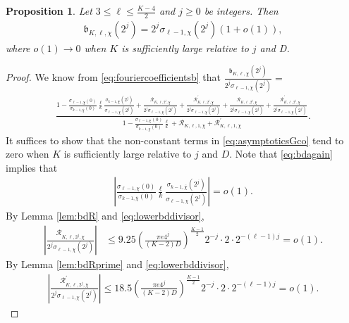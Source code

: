 \documentclass[11pt,letterpaper,reqno]{amsart}
\numberwithin{figure}{section}
\numberwithin{table}{section}
\theoremstyle{definition}
\theoremstyle{plain}
\newtheorem{proposition}[theorem]{Proposition}
\theoremstyle{definition}
\theoremstyle{definition}
\theoremstyle{remark}
\numberwithin{equation}{section}
\theoremstyle{remark}
\begin{document}
\begin{proposition}\label{prop:asymptoticB}
   Let $3\leq\ell\leq\frac{K-4}{2}$ and $j\geq0$ be integers. Then
    \begin{align*}
        \mathfrak{b}_{K,\ell,\chi}(2^j)=2^{j}\sigma_{\ell-1,\chi}(2^{j})(1+o(1)),
    \end{align*}
    where $o(1)\rightarrow 0$ when $K$ is sufficiently large relative to $j$ and D.
\end{proposition}
\begin{proof}
We know from \eqref{eq:fouriercoefficientsb} that $    \frac{\mathfrak{b}_{K,\ell,\chi}(2^j)}{2^{j}\sigma_{\ell-1,\chi}(2^{j})}=$
\begin{align}
\frac{1-\frac{\sigma_{\ell-1,\chi}(0)}{\sigma_{k-1,\overline{\chi}}(0)}\frac{\ell}{k}\frac{\sigma_{k-1,\overline{\chi}}(2^j)}{\sigma_{\ell-1,\chi}(2^{j})}+\frac{\mathcal{R}_{K,\ell,2^j,\chi}}{2^{j}\sigma_{\ell-1,\chi}(2^{j})}+\frac{\mathcal{R}_{K,\ell,2^j,\chi}^{\prime}}{2^j\sigma_{\ell-1,\chi}(2^{j})}+\frac{\mathscr{R}_{K,\ell,2^j,\chi}}{2^j\sigma_{\ell-1,\chi}(2^{j})}+\frac{\mathscr{R}_{K,\ell,2^j,\chi}^{\prime}}{2^j\sigma_{\ell-1,\chi}(2^{j})}}{1-\frac{\sigma_{\ell-1,\chi}(0)}{\sigma_{k-1,\overline{\chi}}(0)}\frac{\ell}{k}+\mathscr{R}_{K,\ell,1,\chi}+\mathscr{R}^{\prime}_{K,\ell,1,\chi}}.\label{eq:asymptoticsGco}
\end{align}
It suffices to show that the non-constant terms in \eqref{eq:asymptoticsGco} tend to zero when $K$ is sufficiently large relative to $j$ and $D$. Note that \eqref{eq:bdagain} implies that
\begin{align*}
    \left|\frac{\sigma_{\ell-1,\chi}(0)}{\sigma_{k-1,\overline{\chi}}(0)}\frac{\ell}{k}\frac{\sigma_{k-1,\overline{\chi}}(2^j)}{\sigma_{\ell-1,\chi}(2^j)}\right|=o(1).
\end{align*}
By Lemma \ref{lem:bdR} and \eqref{eq:lowerbddivisor},
\begin{align}
    \left|\frac{\mathcal{R}_{K,\ell,2^j,\chi}}{2^{j}\sigma_{\ell-1,\chi}(2^{j})}\right|&\leq 9.25\left(\frac{\pi e4^j}{(K-2)D}\right)^{\frac{K-1}{2}}2^{-j}\cdot 2\cdot2^{-(\ell-1)j}=o(1).
\end{align}
By Lemma \ref{lem:bdRprime} and \eqref{eq:lowerbddivisor}, 
\begin{align*}
    \left|\frac{\mathcal{R}^{\prime}_{K,\ell,2^j,\chi}}{2^{j}\sigma_{\ell-1,\chi}(2^{j})}\right|\leq18.5\left(\frac{\pi e4^j}{(K-2)D}\right)^{\frac{K-1}{2}}2^{-j}\cdot 2\cdot2^{-(\ell-1)j}=o(1).

\end{align*}
\end{proof}
\end{document}
